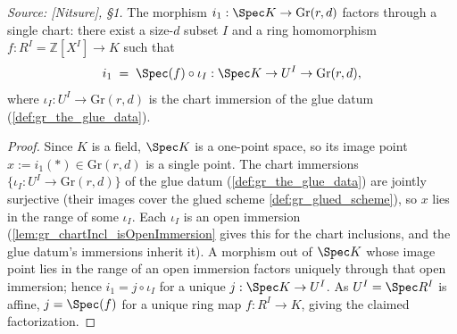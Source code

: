 \begin{lemma}

  \label{lem:gr_existence_chart_factorization}
  \textit{Source: [Nitsure], \S 1.}
  The morphism \(i_1 : \Spec K \to \mathrm{Gr}(r,d)\) factors through a single
  chart: there exist a size-\(d\) subset \(I\) and a ring homomorphism \(f : R^I =
  \mathbb{Z}[X^I] \to K\) such that
  \[
    i_1 \;=\; \Spec(f) \circ \iota_I : \Spec K \to U^I \to \mathrm{Gr}(r,d),
  \]
  where \(\iota_I : U^I \to \mathrm{Gr}(r,d)\) is the chart immersion of the glue
  datum (\cref{def:gr_the_glue_data}).
\end{lemma}
\begin{proof}
  \leanok
  Since \(K\) is a field, \(\Spec K\) is a one-point space, so its image point \(x
  := i_1(\ast) \in \mathrm{Gr}(r,d)\) is a single point. The chart immersions
  \(\{\iota_I : U^I \to \mathrm{Gr}(r,d)\}\) of the glue datum
  (\cref{def:gr_the_glue_data}) are jointly surjective (their images cover the
  glued scheme \cref{def:gr_glued_scheme}), so \(x\) lies in the range of some
  \(\iota_I\). Each \(\iota_I\) is an open immersion
  (\cref{lem:gr_chartIncl_isOpenImmersion} gives this for the chart inclusions, and
  the glue datum's immersions inherit it). A morphism out of \(\Spec K\) whose
  image point lies in the range of an open immersion factors uniquely through that
  open immersion; hence \(i_1 = j \circ \iota_I\) for a unique \(j : \Spec K \to
  U^I\). As \(U^I = \Spec R^I\) is affine, \(j = \Spec(f)\) for a unique ring map
  \(f : R^I \to K\), giving the claimed factorization.
\end{proof}

